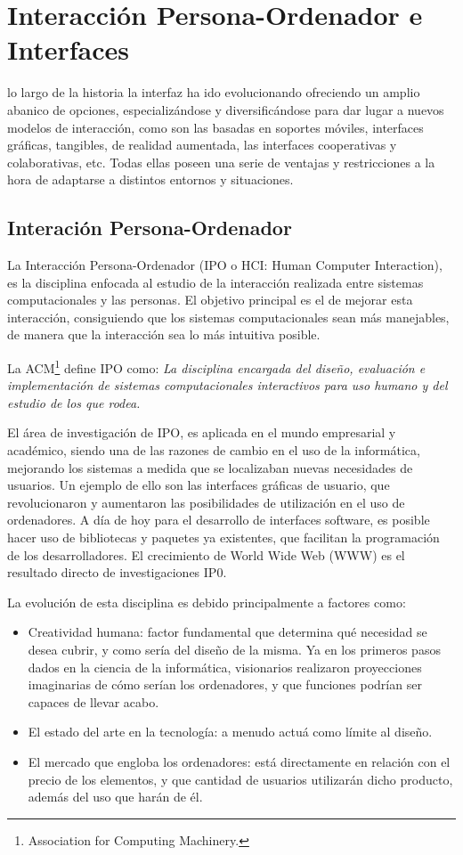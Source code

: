 \chapter{Interacción Persona-Ordenador e Interfaces}
\label{chap:interfaces}
 lo largo de la historia la interfaz ha ido evolucionando ofreciendo un amplio abanico de opciones,
especializándose y diversificándose para dar lugar a nuevos modelos de interacción, como son las basadas en soportes móviles, interfaces gráficas, tangibles, de realidad aumentada, las interfaces cooperativas y colaborativas, etc. Todas ellas poseen una serie de ventajas y restricciones a la hora de adaptarse a distintos entornos y situaciones.


\section{Interación Persona-Ordenador}
La Interacción Persona-Ordenador (IPO o HCI: Human Computer Interaction), es la disciplina enfocada al estudio de la interacción realizada entre sistemas computacionales y las personas. El objetivo principal es el de mejorar esta interacción, consiguiendo que los sistemas computacionales sean más manejables, de manera que la interacción sea lo más intuitiva posible. 

La ACM\footnote{Association for Computing Machinery.} define IPO como: \emph{La disciplina encargada del diseño, evaluación e implementación de sistemas computacionales interactivos para uso humano y del estudio de los que rodea.}

El área de investigación de IPO, es aplicada en el mundo empresarial y académico, siendo una de las razones de cambio en el uso de la informática, mejorando los sistemas a medida que se localizaban nuevas necesidades de usuarios. Un ejemplo de ello son las interfaces gráficas de usuario, que revolucionaron y aumentaron las posibilidades de utilización en el uso de ordenadores. A día de hoy para el desarrollo de interfaces software, es posible hacer uso de bibliotecas y paquetes ya existentes, que facilitan la programación de los desarrolladores. El crecimiento de World Wide Web (WWW) es el resultado directo de investigaciones IP0.

La evolución de esta disciplina es debido principalmente a factores como:
\begin{itemize}
\item Creatividad humana: factor fundamental que determina qué necesidad se desea cubrir, y como sería del diseño de la misma. Ya en los primeros pasos dados en la ciencia de la informática, visionarios realizaron proyecciones imaginarias de cómo serían los ordenadores, y que funciones podrían ser capaces de llevar acabo.
\item El estado del arte en la tecnología: a menudo actuá como límite al diseño.
\item El mercado que engloba los ordenadores: está directamente en relación con el precio de los elementos, y que cantidad de usuarios utilizarán dicho producto, además del uso que harán de él.
\end{itemize}

